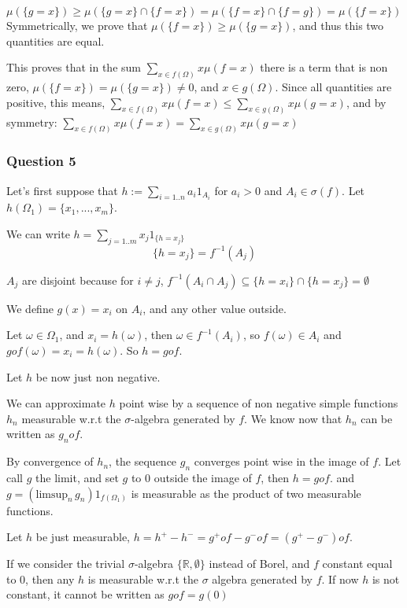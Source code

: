 \documentclass[12pt]{article}
\newcommand{\Q}[1]{\subsubsection*{Question #1}}
\newcommand{\inter}[1]{\underset{#1}{\cap} }
\begin{document}
\begin{itemize}
$\mu(\{g = x\}) \geq \mu(\{g = x\} \inter{} \{f=x\}) = \mu(\{f = x\} \inter{} \{f=g\}) = \mu(\{f = x\})$ 
Symmetrically, we prove that $\mu(\{f = x\}) \geq \mu(\{g = x\})$, and thus this two quantities are equal.

This proves that in the sum $\sum_{x \in f(\Omega)} x \mu(f = x)$ there is a term that is non zero, $\mu(\{f = x\}) = \mu(\{g=x\}) \neq 0$, and $x \in g(\Omega)$. Since all quantities are positive, this means, $\sum_{x \in f(\Omega)} x \mu(f = x) \leq \sum_{x \in g(\Omega)} x \mu(g = x)$, and by symmetry: $\sum_{x \in f(\Omega)} x \mu(f = x) = \sum_{x \in g(\Omega)} x \mu(g = x)$

\end{itemize}

\newpage

\Q{5}


Let's first suppose that $h := \sum_{i=1..n} a_i 1_{A_i}$ for $a_i > 0$ and $A_i \in \sigma(f)$. Let $h(\Omega_1) = \{x_1, ..., x_m\}$.


We can write $h = \sum_{j=1..m} x_j 1_{\{h=x_j\}}$
$$\{ h = x_j \} = f^{-1}(A_j)$$

$A_j$ are disjoint because for $i \neq j$, $f^{-1}(A_i \inter{} A_j) \subseteq \{h = x_i\} \inter{} \{h = x_j\} = \emptyset$


We define $g(x) = x_i$ on $A_i$, and any other value outside. 

Let $\omega \in \Omega_1$, and $x_i = h(\omega)$, then $\omega \in f^{-1}(A_i)$, so $f(\omega) \in A_i$ and $gof(\omega) = x_i = h(\omega)$. So $h = gof$.


Let $h$ be now just non negative.


We can approximate $h$ point wise by a sequence of non negative simple functions $h_n$ measurable w.r.t the $\sigma$-algebra generated by $f$. We know now that $h_n$ can be written as $g_n o f$.

By convergence of $h_n$, the sequence $g_n$ converges point wise in the image of $f$. Let call $g$ the limit, and set $g$ to 0 outside the image of $f$, then $h = gof$. and $g = (\text{limsup}_n \, g_n) 1_{f(\Omega_1)}$ is measurable as the product of two measurable functions.

Let $h$ be just measurable, $h = h^+ - h^- = g^+of - g^-of = (g^+ - g^-) o f$.

If we consider the trivial $\sigma$-algebra $\{\mathbb{R}, \emptyset \}$ instead of Borel, and $f$ constant equal to $0$, then any $h$ is measurable w.r.t the $\sigma$ algebra generated by $f$. If now $h$ is not constant, it cannot be written as $gof = g(0)$
\end{document}

